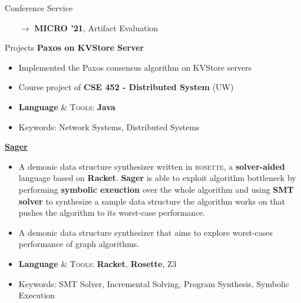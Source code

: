 \documentclass{resume}
\newcommand{\myul}[2][blue]{\setulcolor{#1}\ul{#2}\setulcolor{blue}}
\begin{document}
	\vspace{-5pt}
	\begin{rSection}{Conference Service}
    	\begin{enumerate}
    		\setlength{\itemsep}{1pt}
            \setlength{\parskip}{0pt}
    		\setlength{\parsep}{0pt}
    		\item[$\rightarrow$] \textbf{MICRO '21}, Artifact Evaluation
    	\end{enumerate}
	\end{rSection}
    \begin{rSection}{Projects}
        \textbf{Paxos on KVStore Server}
        \vspace{-5pt}
        \begin{itemize}
			\setlength{\itemsep}{1pt}
            \setlength{\parskip}{0pt}
			\setlength{\parsep}{0pt}
			\item Implemented the Paxos consensus algorithm on KVStore servers
			\item Course project of \textbf{CSE 452 - Distributed System} (UW)
			\item \textbf{Language} \& \textsc{Tools}: \textbf{Java}
			\item Keywords: Network Systems, Distributed Systems
		\end{itemize}
		\vspace{-5pt}
		\textbf{\href{https://github.com/AD1024/Sager}{\color{blue} \myul{Sager}}} %
		\vspace{-5pt}
		\begin{itemize}
			\setlength{\itemsep}{1pt}
            \setlength{\parskip}{0pt}
			\setlength{\parsep}{0pt}
			\item A demonic data structure synthesizer written in \textsc{rosette}, a \textbf{solver-aided} language based on \textbf{Racket}. \textbf{Sager} is able to exploit algorithm bottleneck by performing \textbf{symbolic exeuction} over the whole algorithm and using \textbf{SMT solver} to synthesize a sample data structure the algorithm works on that pushes the algorithm to its worst-case performance.
			\item A demonic data structure synthesizer that aims to explore worst-cases performance of graph algorithms.
			\item \textbf{Language} \& \textsc{Tools}: \textbf{Racket}, \textbf{Rosette}, \textsc{Z3}
			\item Keywords: SMT Solver, Incremental Solving, Program Synthesis, Symbolic Execution
		\end{itemize}
		\vspace{-5pt}


\end{rSection}
\end{document}

